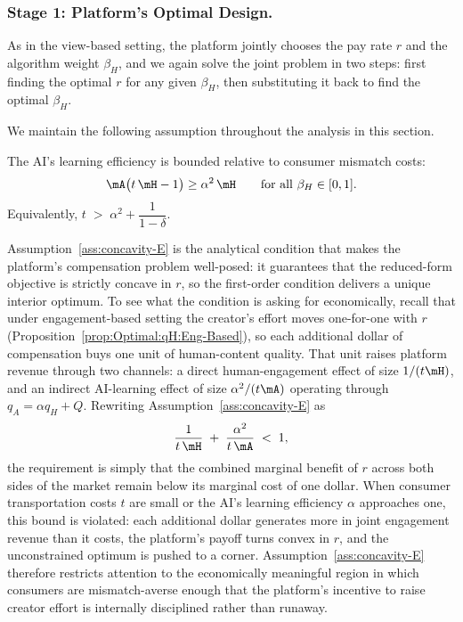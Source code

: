 \subsubsection*{Stage 1: Platform's Optimal Design.}
As in the view-based setting, the platform jointly chooses the pay rate $r$ and the algorithm weight $\beta_H$, and we again solve the joint problem in two steps: first finding the optimal $r$ for any given $\beta_H$, then substituting it back to find the optimal $\beta_H$. 

We maintain the following assumption throughout the analysis in this section.

\begin{assumption}\label{ass:concavity-E}
The AI's learning efficiency is bounded relative to consumer mismatch costs:
\[
\mA\bigl(t\,\mH - 1\bigr) \geq \alpha^{2}\,\mH 
\qquad \text{for all } \beta_H \in [0,1].
\]
Equivalently, $t \;>\; \alpha^{2} + \dfrac{1}{1-\delta}$.
\end{assumption}

Assumption~\ref{ass:concavity-E} is the analytical condition that makes the platform's compensation problem well-posed: it guarantees that the reduced-form objective is strictly concave in $r$, so the first-order condition delivers a unique interior optimum. To see what the condition is asking for economically, recall that under engagement-based setting the creator's effort moves one-for-one with $r$ (Proposition~\ref{prop:Optimal:qH:Eng-Based}), so each additional dollar of compensation buys one unit of human-content quality. That unit raises platform revenue through two channels: a direct human-engagement effect of size $1/(t\mH)$, and an indirect AI-learning effect of size $\alpha^{2}/(t\mA)$ operating through $q_A = \alpha q_H + Q$. Rewriting Assumption~\ref{ass:concavity-E} as
\[
\frac{1}{t\,\mH} \;+\; \frac{\alpha^{2}}{t\,\mA} \;<\; 1,
\]
the requirement is simply that the combined marginal benefit of $r$ across both sides of the market remain below its marginal cost of one dollar. When consumer transportation costs $t$ are small or the AI's learning efficiency $\alpha$ approaches one, this bound is violated: each additional dollar generates more in joint engagement revenue than it costs, the platform's payoff turns convex in $r$, and the unconstrained optimum is pushed to a corner. Assumption~\ref{ass:concavity-E} therefore restricts attention to the economically meaningful region in which consumers are mismatch-averse enough that the platform's incentive to raise creator effort is internally disciplined rather than runaway.



